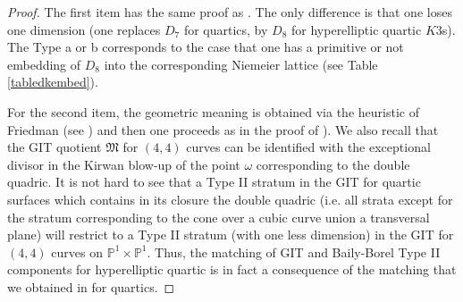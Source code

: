\documentclass[11pt]{amsart}
\numberwithin{equation}{section}
\theoremstyle{plain}
\theoremstyle{remark}
\theoremstyle{definition}
\newcommand{\bP}{\mathbb{P}}
\newcommand{\gM}{\mathfrak{M}}
\begin{document}
\begin{proof}
The first item has the same proof as \cite[Proposition 7.6]{log2}. The only difference is that one loses one dimension (one replaces $D_7$ for quartics, by $D_8$ for hyperelliptic quartic $K3$s). The Type a or b corresponds to the case that one has a primitive or not embedding of $D_8$ into the corresponding Niemeier lattice (see Table \ref{tabledkembed}). 

For the second item, the geometric meaning is obtained via the heuristic of Friedman \cite{friedmanannals} (see \cite[Def. 7.7]{log2}) and then one proceeds as in the proof of \cite[Prop. 7.11]{log2}). We also recall that the GIT quotient $\gM$ for $(4,4)$ curves can be identified with the exceptional divisor in the Kirwan blow-up of the point $\omega$ corresponding to the double quadric. It is not hard to see that a Type II stratum in the GIT for quartic surfaces which contains in its closure the double quadric (i.e. all strata except for the stratum corresponding to the cone over a cubic curve union a transversal plane) will restrict to a Type II stratum (with one less dimension) in the GIT for $(4,4)$ curves on $\bP^1\times\bP^1$. Thus, the matching of GIT and Baily-Borel Type II components for hyperelliptic quartic is in fact a consequence of the matching that we obtained in \cite{log2} for quartics.  
\end{proof}
\end{document}
